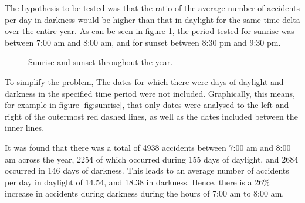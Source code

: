 \documentclass[12pt]{article}
\begin{document}
The hypothesis to be tested was that the ratio of the average number of accidents per day in darkness would be higher than that in daylight for the same time delta over the entire year. 
As can be seen in figure \ref{sunrise-sunset}, the period tested for sunrise was between 7:00 am and 8:00 am, and for sunset between 8:30 pm and 9:30 pm.

\begin{figure}[h]
\centering     %
{}
\caption{Sunrise and sunset throughout the year.}
\label{sunrise-sunset}
\end{figure}

To simplify the problem, The dates for which there were days of daylight and darkness in the specified time period were not included. Graphically, this means, for example in figure \ref{fig:sunrise}, that only dates were analysed to the left and right of the outermost red dashed lines, as well as the dates included between the inner lines.

It was found that there was a total of 4938 accidents between 7:00 am and 8:00 am across the year, 2254 of which occurred during 155 days of daylight, and 2684 occurred in 146 days of darkness. This leads to an average number of accidents per day in daylight of 14.54, and 18.38 in darkness. Hence, there is a 26\% increase in accidents during darkness during the hours of 7:00 am  to 8:00 am.
\end{document}
